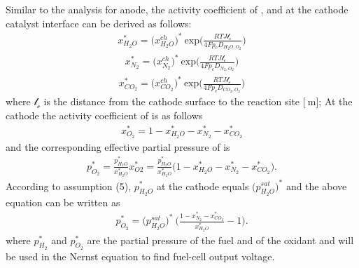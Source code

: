 \documentclass[11pt,a4paper]{article}
\numberwithin{equation}{section}
\theoremstyle{it}
\theoremstyle{definition}
\begin{document}
Similar to the analysis for anode, the activity coefficient of ,  and  at the cathode catalyst interface can be derived as follows:
\begin{equation}\label{eq8}
	\begin{aligned}
		x_{H_2O}^*=\Big(x_{H_2O}^{ch}\Big)^*\ \text{exp}\Bigg(\frac{RTJ\mathcal{l_c}}{4Fp_cD_{H_2O,O_2}}\Bigg)
	\end{aligned}
\end{equation}
\begin{equation}\label{eq9}
	\begin{aligned}
		x_{N_2}^*=\Big(x_{N_2}^{ch}\Big)^*\ \text{exp}\Bigg(\frac{RTJ\mathcal{l_c}}{4Fp_cD_{N_2,O_2}}\Bigg)
	\end{aligned}
\end{equation}
\begin{equation}\label{eq10}
	\begin{aligned}
		x_{CO_2}^*=\Big(x_{CO_2}^{ch}\Big)^*\ \text{exp}\Bigg(\frac{RTJ\mathcal{l_c}}{4Fp_cD_{CO_2,O_2}}\Bigg)
	\end{aligned}
\end{equation}
where $\mathcal{l_c}$ is the distance from the cathode surface to the reaction site $\Big[\SI{}{\meter}\Big]$; At the cathode the activity coefficient of  is as follows
\begin{equation}\label{eq11}
	\begin{aligned}
		x_{O_2}^*=1-x_{H_2O}^*-x_{N_2}^*-x_{CO_2}^*
	\end{aligned}
\end{equation}
\noindent and the corresponding effective partial pressure of  is 
\begin{equation}\label{eq12}
	\begin{aligned}
		p_{O_2}^* = \frac{p_{H_2O}^*}{x_{H_2O}^*} x_{O2}^*=\frac{p_{H_2O}^*}{x_{H_2O}^*}\Big(1-x_{H_2O}^*-x_{N_2}^*-x_{CO_2}^*\Big).
	\end{aligned}
\end{equation}
According to assumption (5), $p_{H_2O}^*$ at the cathode equals $\Big(p_{H_2O}^{sat}\Big)^*$ and the above equation can be written as
\begin{equation}\label{eq13}
	\begin{aligned}
		p_{O_2}^* = \Big(p_{H_2O}^{sat}\Big)^*\ \Big(\frac{1-x_{N_2}^*-x_{CO_2}^*}{x_{H_2O}^*}-1\Big).
	\end{aligned}
\end{equation}
where $p_{H_2}^*$ and $p_{O_2}^*$ are the partial pressure of the fuel and of the oxidant and will be used in the Nernst equation to find fuel-cell output voltage. 
\end{document}
